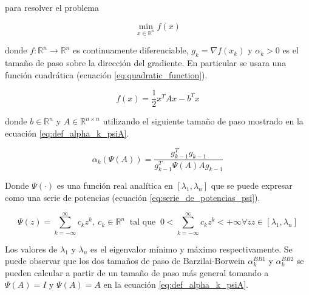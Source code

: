 para resolver el problema

\begin{equation}
	\min_{x\in\mathbb{R}^n}f(x)
\end{equation}

donde $f:\mathbb{R}^n \rightarrow \mathbb{R}^n$ es continuamente diferenciable, $g_k=\nabla f(x_k)$ y $\alpha_k>0$ es el tamaño de paso sobre la dirección del gradiente. En particular se usara una función cuadrática (ecuación \ref{eq:quadratic_function}).

\begin{equation}
	f(x) = \frac{1}{2}x^TAx- b^Tx \label{eq:quadratic_function}
\end{equation}

donde $b\in\mathbb{R}^n$ y $A\in \mathbb{R}^{n\times n}$ utilizando el siguiente tamaño de paso mostrado en la ecuación \ref{eq:def_alpha_k_psiA}.

\begin{equation}
	\alpha_k(\Psi(A)) = \frac{g_{k-1}^Tg_{k-1}}{g^T_{k-1}\Psi(A)Ag_{k-1}} \label{eq:def_alpha_k_psiA}
\end{equation}

Donde $\Psi(\cdot)$ es una función real analítica en $[\lambda_1, \lambda_n]$ que se puede expresar como una serie de potencias (ecuación \ref{eq:serie_de_potencias_psi}).

\begin{equation}
	\Psi(z) = \sum\limits_{k=-\infty}^{\infty} c_kz^k,\ c_k\in \mathbb{R}^n  \;\; \text{tal que} \;\; 0<\sum_{k =- \infty}^{\infty}c_k z^k<+\infty \forall z z\in[\lambda_1,  \lambda_n]  \label{eq:serie_de_potencias_psi}
\end{equation}

Los valores de $\lambda_1$ y $\lambda_n$ es el eigenvalor mínimo y máximo respectivamente. Se puede observar que los dos tamaños de paso de Barzilai-Borwein $\alpha_k^{BB1}$ y $\alpha_k^{BB2}$ se pueden calcular a partir de un tamaño de paso más general tomando a $\Psi(A) = I$ y $\Psi(A) = A$ en la ecuación \ref{eq:def_alpha_k_psiA}.



